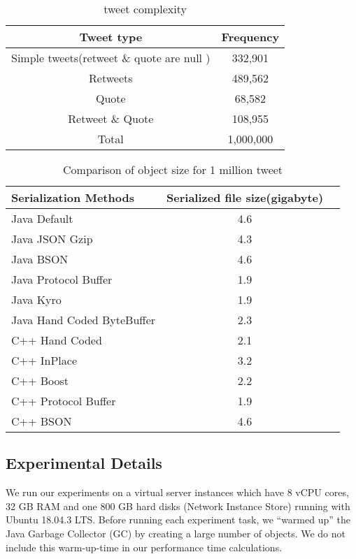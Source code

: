 \begin{table}
	\centering
	\caption{tweet complexity }
	\label{tbl:object_size}
	\begin{adjustbox}{width=\columnwidth,center}	
		
		\begin{tabular}{|c|c|} \hline
			Tweet type & Frequency\\ \hline
			Simple tweets(retweet \& quote are null ) & 332,901\\ \hline
			Retweets & 489,562\\ \hline
			Quote & 68,582\\ \hline
			Retweet \& Quote & 108,955\\ \hline
			Total & 1,000,000 \\ \hline
			
			\hline\end{tabular}
	\end{adjustbox}
\end{table}

\begin{table}
	\centering
	\caption{Comparison of object size for 1 million tweet }
	\label{tbl:object_size}
	\begin{adjustbox}{width=\columnwidth,center}	
		
		\begin{tabular}{|l|c|c|} \hline
		 \textbf{Serialization Methods} & \textbf{Serialized file size(gigabyte)}\\ \hline
			Java Default  & 4.6 \\ \hline	
			Java JSON Gzip  & 4.3 \\ \hline	
			Java BSON  & 4.6 \\ \hline	
			Java Protocol Buffer  & 1.9 \\ \hline	
			Java Kyro  & 1.9 \\ \hline	
			Java Hand Coded ByteBuffer  & 2.3 \\ \hline	
			C++ Hand Coded  & 2.1 \\ \hline	
			C++ InPlace  & 3.2 \\ \hline	
			C++ Boost  & 2.2 \\ \hline	
			C++ Protocol Buffer  & 1.9 \\ \hline
			C++ BSON  & 4.6 \\ \hline					
			\hline\end{tabular}
	\end{adjustbox}
\end{table}


\subsection{Experimental Details}
We run our experiments on a virtual server instances which have 8 vCPU cores, 32 GB RAM and one 800
GB hard disks (Network Instance Store) running with Ubuntu 18.04.3 LTS. Before running each experiment task, we “warmed up” the Java Garbage Collector (GC) by creating a large number of objects. We do not include this warm-up-time in our performance time calculations.

